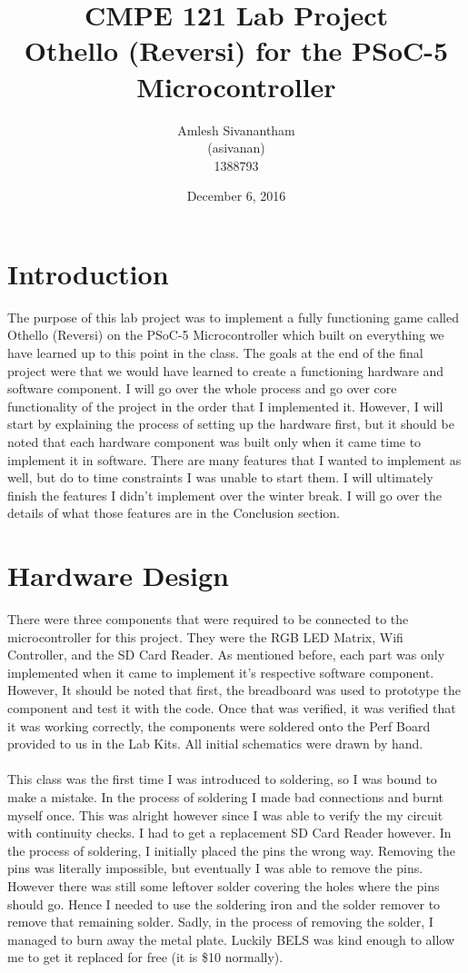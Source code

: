 \documentclass[a4paper, 12pt]{article}
\title{\textbf{CMPE 121 Lab Project} \\ 
    \textbf{Othello (Reversi) for the PSoC-5 Microcontroller}}
\author{Amlesh Sivanantham \\ (asivanan) \\ 1388793}
\date{December 6, 2016}
\begin{document}
	
	\maketitle

	\section{Introduction} 

	The purpose of this lab project was to implement a fully functioning
    game called Othello (Reversi) on the PSoC-5 Microcontroller which built
    on everything we have learned up to this point in the class. The goals at
    the end of the final project were that we would have learned to create
    a functioning hardware and software component. I will go over the whole
    process and go over core functionality of the project in the order that I
    implemented it. However, I will start by explaining the process of
    setting up the hardware first, but it should be noted that each hardware
    component was built only when it came time to implement it in software.
    There are many features that I wanted to implement as well, but do to time
    constraints I was unable to start them. I will ultimately finish
    the features I didn't implement over the winter break. I will go over the
    details of what those features are in the Conclusion section.

    \section{Hardware Design}
 
    There were three components that were required to be connected to the
    microcontroller for this project. They were the RGB LED Matrix, Wifi
    Controller, and the SD Card Reader. As mentioned before, each part was
    only implemented when it came to implement it's respective software
    component. However, It should be noted that first, the breadboard
    was used to prototype the component and test it with the code. Once that
    was verified, it was verified that it was working correctly, the
    components were soldered onto the Perf Board provided to us in the Lab
    Kits. All initial schematics were drawn by hand. 
    \\ \\
    This class was the first time I was introduced to soldering, so I was
    bound to make a mistake. In the process of soldering I made bad
    connections and burnt myself once. This was alright however since I was
    able to verify the my circuit with continuity checks. I had to get a
    replacement SD Card Reader however. In the process of soldering, I
    initially placed the pins the wrong way. Removing the pins was literally
    impossible, but eventually I was able to remove the pins. However there
    was still some leftover solder covering the holes where the pins should
    go. Hence I needed to use the soldering iron and the solder remover to
    remove that remaining solder. Sadly, in the process of removing the
    solder, I managed to burn away the metal plate. Luckily BELS was kind
    enough to allow me to get it replaced for free (it is \$10 normally).
    
\end{document}
